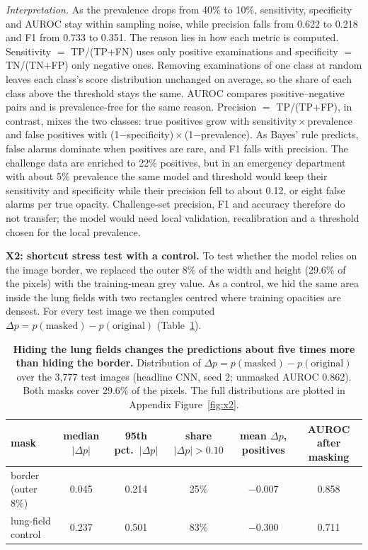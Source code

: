 \documentclass[11pt,a4paper]{article}
\begin{document}
\noindent\emph{Interpretation.} As the prevalence drops from 40\% to 10\%, sensitivity, specificity and AUROC stay within
sampling noise, while precision falls from 0.622 to 0.218 and F1 from 0.733 to 0.351. The reason lies in how each metric is
computed. Sensitivity $=$ TP/(TP+FN) uses only positive examinations and specificity $=$ TN/(TN+FP) only negative ones. Removing examinations of one class at random leaves each class's score distribution unchanged on average, so the share of each class above the threshold stays the same. AUROC compares positive--negative pairs and is prevalence-free for
the same reason. Precision $=$ TP/(TP+FP), in contrast, mixes the two classes: true positives grow with
sensitivity\,$\times$\,prevalence and false positives with (1$-$specificity)\,$\times$\,(1$-$prevalence). As Bayes' rule predicts, false alarms dominate when positives are rare, and F1 falls with precision. The challenge data are enriched to 22\% positives, but in an emergency department with about 5\% prevalence the same model and
threshold would keep their sensitivity and specificity while their precision fell to about 0.12, or eight false alarms per
true opacity. Challenge-set precision, F1 and accuracy therefore do not transfer; the model would need local validation,
recalibration and a threshold chosen for the local prevalence.

\textbf{X2: shortcut stress test with a control.}\label{sec:x2} To test whether the model relies on the image border, we
replaced the outer 8\% of the width and height (29.6\% of the pixels) with the training-mean grey value. As a control, we
hid the same area inside the lung fields with two rectangles centred where training opacities are densest. For every test
image we then computed $\Delta p = p(\text{masked}) - p(\text{original})$ (Table~\ref{tab:x2}).

\begin{table}[!tb]
\centering\footnotesize
\setlength{\tabcolsep}{4pt}
\caption{\textbf{Hiding the lung fields changes the predictions about five times more than hiding the border.} Distribution
of $\Delta p = p(\text{masked}) - p(\text{original})$ over the 3{,}777 test images (headline CNN, seed 2; unmasked AUROC
0.862). Both masks cover 29.6\% of the pixels. The full distributions are plotted in Appendix Figure~\ref{fig:x2}.}
\label{tab:x2}
\begin{tabular}{lccccc}
\toprule
mask & median $|\Delta p|$ & 95th pct.\ $|\Delta p|$ & share $|\Delta p| > 0.10$ & mean $\Delta p$, positives & AUROC after masking \\
\midrule
border (outer 8\%) & 0.045 & 0.214 & 25\% & $-0.007$ & 0.858 \\
lung-field control & 0.237 & 0.501 & 83\% & $-0.300$ & 0.711 \\
\bottomrule
\end{tabular}
\end{table}
\end{document}
